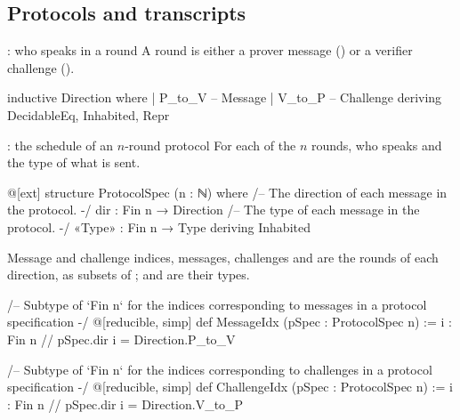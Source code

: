 \subsection{Protocols and transcripts}\label{sec:gen-lib-ark-protocols}

\begin{define}{: who speaks in a round}
A round is either a prover message () or a verifier challenge ().
\end{define}

\begin{leancode}
inductive Direction where
  | P_to_V  -- Message
  | V_to_P -- Challenge
deriving DecidableEq, Inhabited, Repr
\end{leancode}


\begin{define}{: the schedule of an $n$-round protocol}
For each of the $n$ rounds, who speaks and the type of what is sent.
\end{define}

\begin{leancode}
@[ext]
structure ProtocolSpec (n : ℕ) where
  /-- The direction of each message in the protocol. -/
  dir : Fin n → Direction
  /-- The type of each message in the protocol. -/
  «Type» : Fin n → Type
deriving Inhabited
\end{leancode}


\begin{define}{Message and challenge indices, messages, challenges}
 and  are the rounds of each direction, as subsets of
;  and  are their types.
\end{define}

\begin{leancode}
/-- Subtype of `Fin n` for the indices corresponding to messages in a protocol specification -/
@[reducible, simp]
def MessageIdx (pSpec : ProtocolSpec n) :=
  {i : Fin n // pSpec.dir i = Direction.P_to_V}

/-- Subtype of `Fin n` for the indices corresponding to challenges in a protocol specification -/
@[reducible, simp]
def ChallengeIdx (pSpec : ProtocolSpec n) :=
  {i : Fin n // pSpec.dir i = Direction.V_to_P}
\end{leancode}

